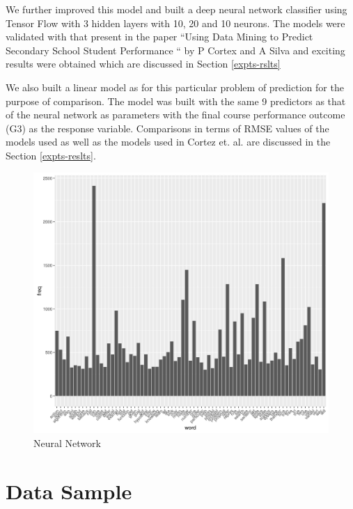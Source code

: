 \documentclass[conference]{IEEEtran}
\begin{document}
We further improved this model and built a deep neural network classifier using Tensor Flow with
3 hidden layers with 10, 20 and 10 neurons. The models were validated with that present
in the paper “Using Data Mining to Predict Secondary School Student Performance “ by
P Cortex and A Silva and exciting results were obtained which are discussed in Section \ref{expts-rslts}

We also built a linear model as for this particular problem of prediction for the purpose of comparison. The model was built with the same 9 predictors as that of the neural network as parameters with the final course performance outcome (G3) as the response variable.
Comparisons in terms of RMSE values of the models used as well as the models used
in Cortez et. al.\cite{ref:4} are discussed in the Section \ref{expts-reslts}.

\begin{figure}
	\includegraphics[width=\linewidth]{ai-vis.jpg}
	\caption{Neural Network}
	\label{fig:ai-vis}
\end{figure}

	\section{Data Sample}
\end{document}
